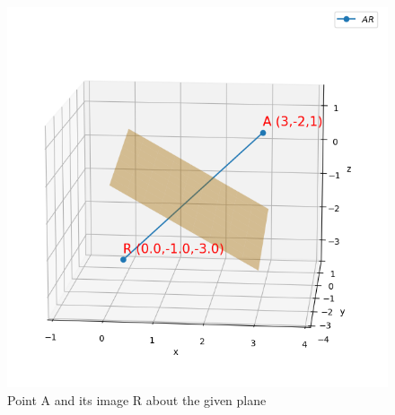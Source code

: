 \documentclass[journal,12pt,twocolumn]{IEEEtran}
\begin{document}
\begin{figure}[ht]
	  \centering 
	  \includegraphics[width=\columnwidth]{figs/fig1.png}
	  \caption{Point A and its image R about the given plane}
	  \label{fig:fig1}
\end{figure}
\end{document}
